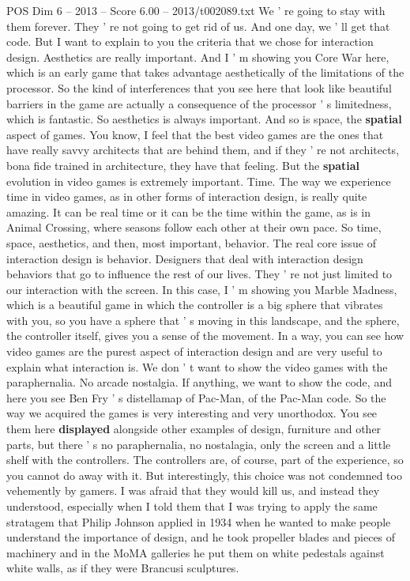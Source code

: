 \begin{textsample}{POS Dim 6 – 2013 – Score 6.00 – 2013/t002089.txt}
We ' re going to stay with them forever.
They ' re not going to get rid of us.
And one day, we ' ll get that code.
But I want to explain to you the criteria that we chose for interaction design.
Aesthetics are really important.
And I ' m showing you Core War here, which is an early game that takes advantage aesthetically of the limitations of the processor.
So the kind of interferences that you see here that look like beautiful barriers in the game are actually a consequence of the processor ' s limitedness, which is fantastic.
So aesthetics is always important.
And so is space, the \textbf{spatial} aspect of games.
You know, I feel that the best video games are the ones that have really savvy architects that are behind them, and if they ' re not architects, bona fide trained in architecture, they have that feeling.
But the \textbf{spatial} evolution in video games is extremely important.
Time.
The way we experience time in video games, as in other forms of interaction design, is really quite amazing.
It can be real time or it can be the time within the game, as is in Animal Crossing, where seasons follow each other at their own pace.
So time, space, aesthetics, and then, most important, behavior.
The real core issue of interaction design is behavior.
Designers that deal with interaction design behaviors that go to influence the rest of our lives.
They ' re not just limited to our interaction with the screen.
In this case, I ' m showing you Marble Madness, which is a beautiful game in which the controller is a big sphere that vibrates with you, so you have a sphere that ' s moving in this landscape, and the sphere, the controller itself, gives you a sense of the movement.
In a way, you can see how video games are the purest aspect of interaction design and are very useful to explain what interaction is.
We don ' t want to show the video games with the paraphernalia.
No arcade nostalgia.
If anything, we want to show the code, and here you see Ben Fry ' s distellamap of Pac-Man, of the Pac-Man code.
So the way we acquired the games is very interesting and very unorthodox.
You see them here \textbf{displayed} alongside other examples of design, furniture and other parts, but there ' s no paraphernalia, no nostalagia, only the screen and a little shelf with the controllers.
The controllers are, of course, part of the experience, so you cannot do away with it.
But interestingly, this choice was not condemned too vehemently by gamers.
I was afraid that they would kill us, and instead they understood, especially when I told them that I was trying to apply the same stratagem that Philip Johnson applied in 1934 when he wanted to make people understand the importance of design, and he took propeller blades and pieces of machinery and in the MoMA galleries he put them on white pedestals against white walls, as if they were Brancusi sculptures.

\end{textsample}
